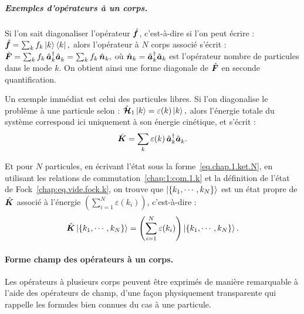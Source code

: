 \subparagraph{Exemples d’opérateurs à un corps.}

Si l’on sait diagonaliser l’opérateur \( \hat{\bm{f}} \), c’est-à-dire si l’on peut écrire :
\(
	\hat{\bm{f}} = \sum_k f_k \ket{k} \bra{k},
\)
alors l’opérateur à $N$ corps associé s’écrit :
\(
	\hat{\bm{F}} = \sum_k f_k \, \hat{\bm{a}}^\dagger_k \hat{\bm{a}}_k^{} = \sum_k f_k \, \hat{\bm{n}}_k,
\)
où \( \hat{\bm{n}}_k = \hat{\bm{a}}^\dagger_k \hat{\bm{a}}_k \) est l’opérateur nombre de particules dans le mode \( k \). On obtient ainsi une forme diagonale de \( \hat{\bm{F}} \) en seconde quantification.
\begin{mdframed}[linewidth=0.5pt, backgroundcolor=gray!5, roundcorner=5pt]
Un exemple immédiat est celui des particules libres. Si l’on diagonalise le problème à une particule selon :
\(
	\hat{\bm{\mathcal{H}}}_1 \ket{k} = \varepsilon(k) \ket{k},
\)
alors l’énergie totale du système correspond ici uniquement à son énergie cinétique, et s’écrit :
\begin{equation}
	\hat{\bm{K}} = \sum_{k} \varepsilon(k) \, \hat{\bm{a}}^\dagger_k \hat{\bm{a}}_k^{}.\label{eq.chap.1.cinietique.1}
\end{equation}

Et pour $N$ particules, en écrivant l’état sous la forme~\eqref{eq.chap.1.ket.N}, en utilisant les relations de commutation~\eqref{chap:1:com.1.k} et la définition de l’état de Fock~\eqref{chap:eq.vide.fock.k}, on trouve que $\ket{\{k_1, \cdots, k_N\}}$ est un état propre de $\hat{\bm{K}}$ associé à l'énergie $\left( \sum_{i = 1}^N \varepsilon(k_i) \right)$, c’est-à-dire :
\begin{eqnarray}
	\hat{\bm{K}} \ket{\{k_1, \cdots, k_N\}} = \left( \sum_{i = 1}^N \varepsilon(k_i) \right) \ket{\{k_1, \cdots, k_N\}}.\label{eq.chap.1.cinietique.2}
\end{eqnarray}
\end{mdframed}

\paragraph{Forme champ des opérateurs à un corps.}

Les opérateurs à plusieurs corps peuvent être exprimés de manière remarquable à l’aide des opérateurs de champ, d’une façon physiquement transparente qui rappelle les formules bien connues du cas à une particule.

